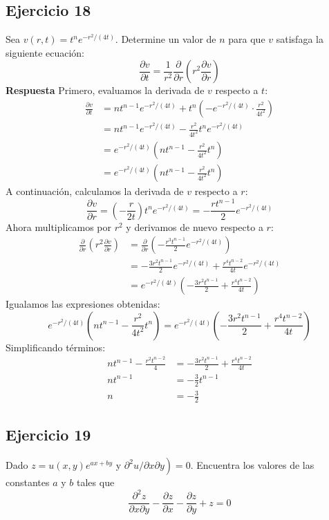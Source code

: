 \documentclass{report}
\begin{document}
    \newpage\subsection*{Ejercicio 18}
    Sea $v(r, t)=t^{n} e^{-r^{2} /(4 t)}$. Determine un valor de $n$ para que $v$ satisfaga la siguiente ecuación:
    $$
    \frac{\partial v}{\partial t}=\frac{1}{r^{2}} \frac{\partial}{\partial r}\left(r^{2} \frac{\partial v}{\partial r}\right)
    $$
    \textbf{Respuesta}
    Primero, evaluamos la derivada de $v$ respecto a $t$:
    $$
    \begin{aligned}
    \frac{\partial v}{\partial t} &= n t^{n-1} e^{-r^{2}/(4t)} + t^n \left(-e^{-r^{2}/(4t)} \cdot \frac{r^2}{4t^2}\right) \\
    &= n t^{n-1} e^{-r^{2}/(4t)} - \frac{r^2}{4t^2} t^n e^{-r^{2}/(4t)} \\
    &= e^{-r^{2}/(4t)} \left( n t^{n-1} - \frac{r^2}{4t^2} t^n \right) \\
    &= e^{-r^{2}/(4t)} \left( n t^{n-1} - \frac{r^2}{4t^2} t^n \right)
    \end{aligned}
    $$
    A continuación, calculamos la derivada de $v$ respecto a $r$:
    $$
    \frac{\partial v}{\partial r} = \left( - \frac{r}{2t} \right) t^n e^{ - r^2 / (4t)} = - \frac{r t^{n-1}}{2} e^{-r^2 / (4t)}
    $$
    Ahora multiplicamos por $r^2$ y derivamos de nuevo respecto a $r$:
    $$
    \begin{aligned}
    \frac{\partial}{\partial r} \left( r^2 \frac{\partial v}{\partial r} \right) &= \frac{\partial}{\partial r} \left( - \frac{r^3 t^{n-1}}{2} e^{-r^2 / (4t)} \right) \\
    &= - \frac{3r^2 t^{n-1}}{2} e^{-r^2 / (4t)} + \frac{r^4 t^{n-2}}{4t} e^{-r^2 / (4t)} \\
    &= e^{-r^2 / (4t)} \left( - \frac{3r^2 t^{n-1}}{2} + \frac{r^4 t^{n-2}}{4t} \right)
    \end{aligned}
    $$
    Igualamos las expresiones obtenidas:
    $$
    e^{-r^2 / (4t)} \left( n t^{n-1} - \frac{r^2}{4t^2} t^n \right) = e^{-r^2 / (4t)} \left( - \frac{3r^2 t^{n-1}}{2} + \frac{r^4 t^{n-2}}{4t} \right)
    $$
    Simplificando términos:
    $$
    \begin{aligned}
    n t^{n-1} - \frac{r^2 t^{n-2}}{4} &= - \frac{3r^2 t^{n-1}}{2} + \frac{r^4 t^{n-2}}{4t} \\
    n t^{n-1} &= - \frac{3}{2} t^{n-1} \\
    n &= -\frac{3}{2}
    \end{aligned}
    $$\subsection*{Ejercicio 19}
    Dado $z=u(x, y) e^{a x+b y}$ y $\left.\partial^{2} u / \partial x \partial y\right)=0$. Encuentra los valores de las constantes $a$ y $b$ tales que
    $$
    \frac{\partial^{2} z}{\partial x \partial y}-\frac{\partial z}{\partial x}-\frac{\partial z}{\partial y}+z=0
    $$
\end{document}
